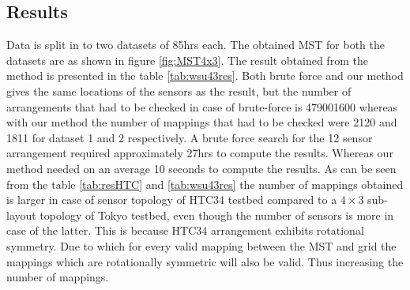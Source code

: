 \subsection{Results}
Data is split in to two datasets of 85hrs each. The obtained MST for both the datasets are as shown in figure \ref{fig:MST4x3}. The result obtained from the method is presented in the table \ref{tab:wsu43res}. Both brute force and our method gives the same locations of the sensors as the result, but the number of arrangements that had to be checked in case of brute-force is 479001600 whereas with our method the number of mappings that had to be checked were 2120 and 1811 for dataset 1 and 2 respectively. A brute force search for the 12 sensor arrangement required approximately 27hrs to compute the results. Whereas our method needed on an average 10 seconds to compute the results. As can be seen from the table \ref{tab:resHTC} and \ref{tab:wsu43res} the number of mappings obtained is larger in case of sensor topology of HTC34 testbed compared to a $4 \times 3$ sub-layout topology of Tokyo testbed, even though the number of sensors is more in case of the latter. This is because HTC34 arrangement exhibits rotational symmetry. Due to which for every valid mapping between the MST and grid the mappings which are rotationally symmetric will also be valid. Thus increasing the number of mappings.
